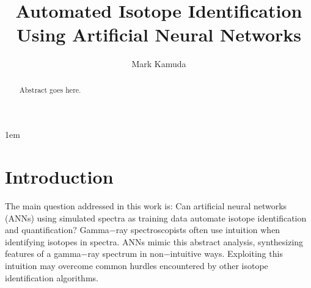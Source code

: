 \documentclass[tocnosub,noragright,centerchapter,12pt,fullpage]{uiucecethesis09}
\title{Automated Isotope Identification Using Artificial Neural Networks}
\author{Mark Kamuda}
\begin{document}
%

%
\maketitle

\parindent 1em%

\frontmatter


\begin{abstract}
Abstract goes here.
\end{abstract}

\tableofcontents

\listoftables

\listoffigures

\mainmatter


\chapter{Introduction}

The main question addressed in this work is: Can artificial neural networks (ANNs) using simulated spectra as training data automate isotope identification and quantification? Gamma$-$ray spectroscopists often use intuition when identifying isotopes in spectra. ANNs mimic this abstract analysis, synthesizing features of a gamma$-$ray spectrum in non$-$intuitive ways. Exploiting this intuition may overcome common hurdles encountered by other isotope identification algorithms. 

\end{document}
